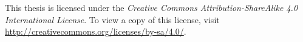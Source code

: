 \documentclass[a4paper,12pt]{article}
\begin{document}
	\vfill

	\begin{figure}
		\vspace{-22pt}
		\begin{flushright}
			{\Huge \ccbysa}
		\end{flushright}
	\end{figure}

	\noindent This thesis is licensed under the \textit{Creative Commons Attribution-ShareAlike 4.0 International License}. To view a copy of this license, visit \url{http://creativecommons.org/licenses/by-sa/4.0/}.

\newpage

	
\end{document}
